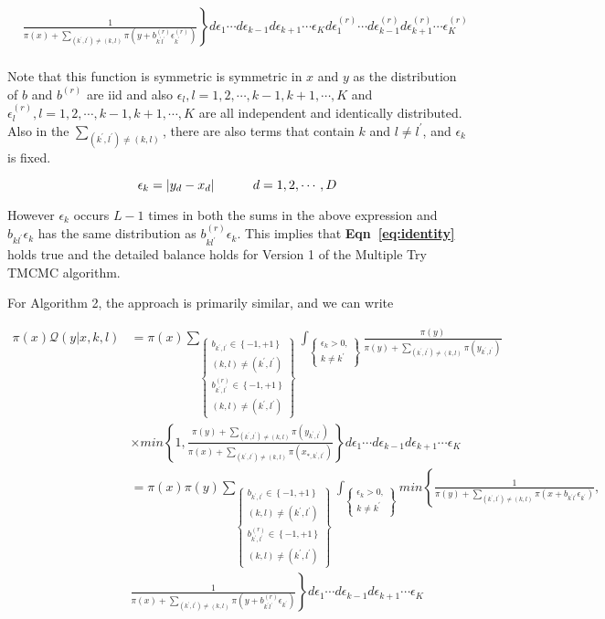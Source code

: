\begin{align*}
& \left . \frac{1}{\pi(x) + \sum_{(k^{'},l^{'}) \neq (k,l)} \pi(y+b^{(r)}_{k^{'}l^{'}} \epsilon^{(r)}_{k^{'}})} \right \} d \epsilon_1 \cdots d \epsilon_{k-1} d \epsilon_{k+1} \cdots \epsilon_{K} d \epsilon^{(r)}_1 \cdots d \epsilon^{(r)}_{k-1} d \epsilon^{(r)}_{k+1} \cdots \epsilon^{(r)}_{K} \\
\end{align*}

Note that this function is symmetric is symmetric in $x$ and $y$ as the distribution of $b$ and $b^{(r)}$ are iid and also $\epsilon_{l}, l=1,2,\cdots,k-1,k+1, \cdots, K$ and $\epsilon^{(r)}_{l}, l=1,2,\cdots, k-1, k+1, \cdots, K$ are all independent and identically distributed. Also in the $\sum_{(k^{'},l^{'}) \neq (k,l)}$, there are also terms that contain $k$ and $l \neq l^{'}$, and $\epsilon_{k}$ is fixed.

$$ \epsilon_{k} = \left | y_{d} -x_{d}  \right | \hspace{1 cm} d=1,2,\cdots, D $$

However $\epsilon_{k}$ occurs $L-1$ times in both the sums in the above expression and $b_{kl^{'}} \epsilon_{k}$ has the same distribution as $b^{(r)}_{kl^{'}} \epsilon_{k}$. This implies that \textbf{Eqn~\ref{eq:identity}} holds true and the detailed balance holds for Version 1 of the Multiple Try TMCMC algorithm. 

For Algorithm 2, the approach is primarily similar, and we can write 

\begin{align*}
\pi(x) \mathcal{Q}(y | x, k, l)  & = \pi (x) \sum_{\left \{ \substack{b_{k^{'},l^{'}} \in \left \{-1,+1 \right \} \\
(k,l) \neq (k^{'}, l^{'}) \\ b^{(r)}_{k^{'},l^{'}} \in \left \{-1,+1 \right \} \\ (k,l) \neq (k^{'}, l^{'})}  \right \}} \int_{ \left \{ \substack{\epsilon_k > 0,\\ k \neq k^{'} }\right \}}   \frac{\pi(y)}{\pi(y) + \sum_{(k^{'},l^{'}) \neq (k,l)} \pi(y_{k^{'},l^{'}})}   \\
& \times min \left \{ 1, \frac{\pi(y) + \sum_{(k^{'},l^{'}) \neq (k,l)} \pi(y_{k^{'},l^{'}})} {\pi(x) + \sum_{(k^{'},l^{'}) \neq (k,l)} \pi(x_{*, k^{'},l^{'}})} \right \} d \epsilon_1 \cdots d \epsilon_{k-1} d \epsilon_{k+1} \cdots \epsilon_{K}  \\
& =  \pi(x) \pi(y)  \sum_{\left \{ \substack{b_{k^{'},l^{'}} \in \left \{-1,+1 \right \} \\
(k,l) \neq (k^{'}, l^{'}) \\ b^{(r)}_{k^{'},l^{'}} \in \left \{-1,+1 \right \} \\ (k,l) \neq (k^{'}, l^{'})}  \right \}} \int_{ \left \{ \substack{\epsilon_k > 0,\\ k \neq k^{'}} \right \}} min \left \{ \frac{1}{\pi(y) + \sum_{(k^{'},l^{'}) \neq (k,l)} \pi(x+b_{k^{'}l^{'}}\epsilon_{k^{'}})},  \right . \\
& \left . \frac{1}{\pi(x) + \sum_{(k^{'},l^{'}) \neq (k,l)} \pi(y+b^{(r)}_{k^{'}l^{'}} \epsilon_{k^{'}})} \right \} d \epsilon_1 \cdots d \epsilon_{k-1} d \epsilon_{k+1} \cdots \epsilon_{K} \\
\end{align*}

